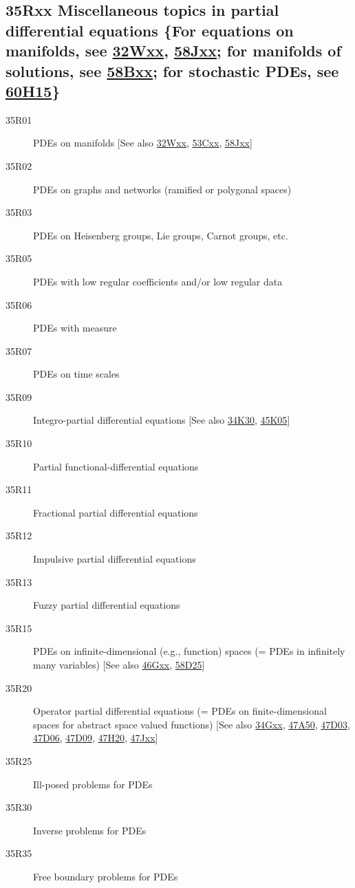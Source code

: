 \subsection*{35Rxx  Miscellaneous topics in partial differential equations \{For equations on manifolds, see \hyperref[32Wxx]{32Wxx}, \hyperref[58Jxx]{58Jxx}; for manifolds of solutions, see \hyperref[58Bxx]{58Bxx}; for stochastic PDEs, see \hyperref[60H15]{60H15}\} }\label{35Rxx}
\begin{description}  
\item [35R01]\label{35R01} PDEs on manifolds [See also \hyperref[32Wxx]{32Wxx}, \hyperref[53Cxx]{53Cxx}, \hyperref[58Jxx]{58Jxx}]
\item [35R02]\label{35R02} PDEs on graphs and networks (ramified or polygonal spaces)
\item [35R03]\label{35R03} PDEs on Heisenberg groups, Lie groups, Carnot groups, etc.
\item [35R05]\label{35R05} PDEs with low regular coefficients and/or low regular data
\item [35R06]\label{35R06} PDEs with measure
\item [35R07]\label{35R07} PDEs on time scales
\item [35R09]\label{35R09} Integro-partial differential equations [See also \hyperref[34K30]{34K30}, \hyperref[45K05]{45K05}]
\item [35R10]\label{35R10} Partial functional-differential equations
\item [35R11]\label{35R11} Fractional partial differential equations
\item [35R12]\label{35R12} Impulsive partial differential equations
\item [35R13]\label{35R13} Fuzzy partial differential equations
\item [35R15]\label{35R15} PDEs on infinite-dimensional (e.g., function) spaces (= PDEs in infinitely many variables) [See also \hyperref[46Gxx]{46Gxx}, \hyperref[58D25]{58D25}]
\item [35R20]\label{35R20} Operator partial differential equations  (= PDEs on finite-dimensional spaces for abstract space valued functions) [See also \hyperref[34Gxx]{34Gxx}, \hyperref[47A50]{47A50}, \hyperref[47D03]{47D03}, \hyperref[47D06]{47D06}, \hyperref[47D09]{47D09}, \hyperref[47H20]{47H20}, \hyperref[47Jxx]{47Jxx}]
\item [35R25]\label{35R25} Ill-posed problems for PDEs
\item [35R30]\label{35R30} Inverse problems for PDEs
\item [35R35]\label{35R35} Free boundary problems for PDEs

\end{description}
